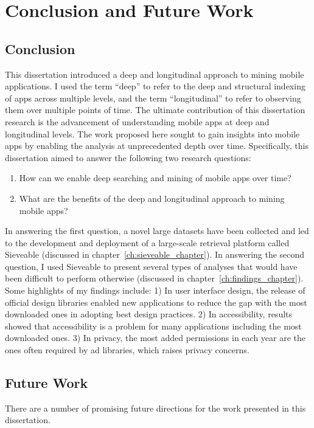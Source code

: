 \chapter{Conclusion and Future Work}
\label{ch:conclusion}

\section{Conclusion}
This dissertation introduced a deep and longitudinal approach to mining mobile applications.
I used the term ``deep'' to refer to the deep and structural indexing of apps across multiple levels, and the term ``longitudinal'' to refer to observing them over multiple points of time.
The ultimate contribution of this dissertation research is the advancement of understanding mobile apps at deep and longitudinal levels.
The work proposed here sought to gain insights into mobile apps by enabling the analysis at unprecedented depth over time.
Specifically, this dissertation aimed to answer the following two research questions:
\begin{enumerate}
	\item How can we enable deep searching and mining of mobile apps over time?
	\item What are the benefits of the deep and longitudinal approach to mining mobile apps?
\end{enumerate}
In answering the first question, a novel large datasets have been collected and led to the development and deployment of a large-scale retrieval platform called Sieveable (discussed in chapter~\ref{ch:sieveable_chapter}).
In answering the second question, I used Sieveable to present several types of analyses that would have been difficult to perform otherwise  (discussed in chapter~\ref{ch:findings_chapter}).
Some highlights of my findings include:
1) In user interface design, the release of official design libraries enabled new applications to reduce the gap with the most downloaded ones in adopting best design practices.
2) In accessibility, results showed that accessibility is a problem for many applications including the most downloaded ones.
3) In privacy, the most added permissions in each year are the ones often required by ad libraries, which raises privacy concerns.

\section{Future Work}
There are a number of promising future directions for the work presented in this dissertation.

